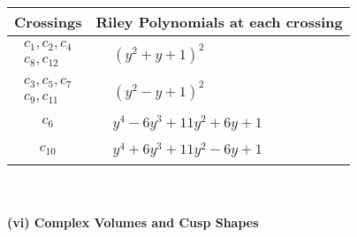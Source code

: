 \documentclass[1p]{elsarticle_modified}
\theoremstyle{definition}
\begin{document}
\begin{tabular}{m{50pt}|m{274pt}}
Crossings & \hspace{64pt}Riley Polynomials at each crossing \\
\hline $$\begin{aligned}c_{1},c_{2},c_{4}\\c_{8},c_{12}\end{aligned}$$&$\begin{aligned}
&(y^2+y+1)^2
\end{aligned}$\\
\hline $$\begin{aligned}c_{3},c_{5},c_{7}\\c_{9},c_{11}\end{aligned}$$&$\begin{aligned}
&(y^2- y+1)^2
\end{aligned}$\\
\hline $$\begin{aligned}c_{6}\end{aligned}$$&$\begin{aligned}
&y^4-6 y^3+11 y^2+6 y+1
\end{aligned}$\\
\hline $$\begin{aligned}c_{10}\end{aligned}$$&$\begin{aligned}
&y^4+6 y^3+11 y^2-6 y+1
\end{aligned}$\\
\hline
\end{tabular}\\~\\
\newpage\flushleft \textbf{(vi) Complex Volumes and Cusp Shapes}
\end{document}
